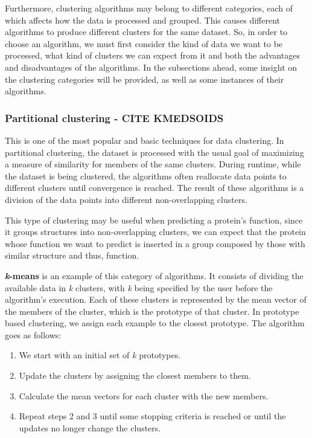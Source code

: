 Furthermore, clustering algorithms may belong to different categories, each of which affects how the data is processed and grouped. This causes different algorithms to produce different clusters for the same dataset. So, in order to choose an algorithm, we must first consider the kind of data we want to be processed, what kind of clusters we can expect from it and both the advantages and disadvantages of the algorithms. In the subsections ahead, some insight on the clustering categories will be provided, as well as some instances of their algorithms.

\medskip
\subsubsection{Partitional clustering - CITE KMEDSOIDS}

This is one of the most popular and basic techniques for data clustering. In partitional clustering, the dataset is processed with the usual goal of maximizing a measure of similarity for members of the same clusters. During runtime, while the dataset is being clustered, the algorithms often reallocate data points to different clusters until convergence is reached. The result of these algorithms is a division of the data points into different non-overlapping clusters.

This type of clustering may be useful when predicting a protein's function, since it groups structures into non-overlapping clusters, we can expect that the protein whose function we want to predict is inserted in a group composed by those with similar structure and thus, function.

\textbf{\textit{k}-means} \cite{ethemalpaydin2010} is an example of this category of algorithms. It consists of dividing the available data in \textit{k} clusters, with \textit{k} being specified by the user before the algorithm's execution. Each of these clusters is represented by the mean vector of the members of the cluster, which is the prototype of that cluster. In prototype based clustering, we assign each example to the closest prototype. The algorithm goes as follows:

\begin{enumerate}
	\item We start with an initial set of \textit{k} prototypes.
	\item Update the clusters by assigning the closest members to them.
	\item Calculate the mean vectors for each cluster with the new members.
	\item Repeat steps 2 and 3 until some stopping criteria is reached or until the updates no longer change the clusters.
\end{enumerate}

